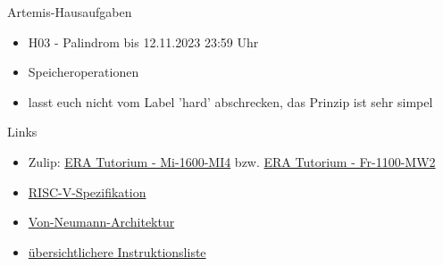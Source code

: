 \documentclass[
  german,            %
  aspectratio=169,    %
]{tumbeamer}
\begin{document}
\begin{frame}[c]{Artemis-Hausaufgaben}{}
  \begin{itemize}
    \item H03 - Palindrom bis 12.11.2023 23:59 Uhr
    \item Speicheroperationen
    \item lasst euch nicht vom Label 'hard' abschrecken, das Prinzip ist sehr simpel
  \end{itemize}
\end{frame}

\begin{frame}[fragile, c]{Links}{}
  \begin{itemize}
    \item Zulip: \href{https://zulip.in.tum.de/#narrow/stream/1917-ERA-Tutorium---Mi-1600-MI4}{\glqq ERA Tutorium - Mi-1600-MI4\grqq}
    bzw. \href{https://zulip.in.tum.de/#narrow/stream/1940-ERA-Tutorium---Fr-1100-MW2}{\glqq ERA Tutorium - Fr-1100-MW2\grqq}
    \item \href{https://riscv.org/wp-content/uploads/2017/05/riscv-spec-v2.2.pdf}{RISC-V-Spezifikation}
    \item \href{https://www.geeksforgeeks.org/computer-organization-von-neumann-architecture/}{Von-Neumann-Architektur}
    \item \href{https://msyksphinz-self.github.io/riscv-isadoc/html/rvi.html}{übersichtlichere Instruktionsliste}
  \end{itemize}
\end{frame}

\maketitle
\end{document}
